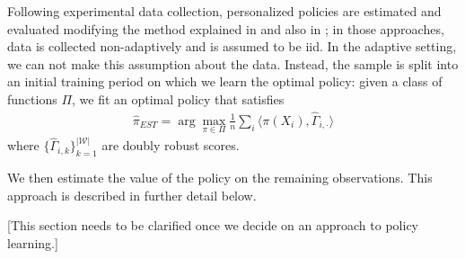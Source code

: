 \documentclass[letterpaper, 12pt, parskip=full, headsepline]{scrartcl}
\begin{document}
Following experimental data collection, personalized policies are estimated and evaluated modifying the method explained in \cite{athey2017efficient} and also in \cite{zhou2018offline}; in those approaches, data is collected non-adaptively and is assumed to be iid. In the adaptive setting, we can not make this assumption about the data. Instead, the sample is split into an initial training period on which we learn the optimal policy: given a class of functions $\Pi$, we fit an optimal policy that satisfies
\begin{align}
  \hat{\pi}_{EST} = \arg\max_{\pi \in \Pi} \frac{1}{n}\sum_{i} \langle \pi(X_{i}), \hat{\Gamma}_{i,\cdot} \rangle
\end{align}
where $\{\hat{\Gamma}_{i,k}\}_{k=1}^{|\mathcal{W}|}$ are doubly robust scores. 

We then estimate the value of the policy on the remaining observations. This approach is described in further detail below. 

{\color{red} [This section needs to be clarified once we decide on an approach to policy learning.] }
\end{document}
